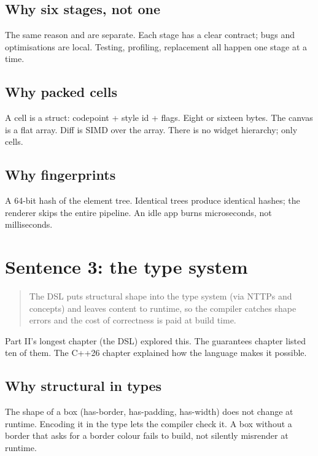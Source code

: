 \subsection*{Why six stages, not one}

The same reason  and  are separate. Each
stage has a clear contract; bugs and optimisations are local.
Testing, profiling, replacement all happen one stage at a time.

\subsection*{Why packed cells}

A cell is a struct: codepoint + style id + flags. Eight or
sixteen bytes. The canvas is a flat array. Diff is SIMD over
the array. There is no widget hierarchy; only cells.

\subsection*{Why fingerprints}

A 64-bit hash of the element tree. Identical trees produce
identical hashes; the renderer skips the entire pipeline. An
idle app burns microseconds, not milliseconds.

\section{Sentence 3: the type system}

\begin{quote}
The DSL puts structural shape into the type system (via NTTPs
and concepts) and leaves content to runtime, so the compiler
catches shape errors and the cost of correctness is paid at
build time.
\end{quote}

Part II's longest chapter (the DSL) explored this. The
guarantees chapter listed ten of them. The C++26 chapter
explained how the language makes it possible.

\subsection*{Why structural in types}

The shape of a box (has-border, has-padding, has-width) does
not change at runtime. Encoding it in the type lets the
compiler check it. A box without a border that asks for a
border colour fails to build, not silently misrender at
runtime.

